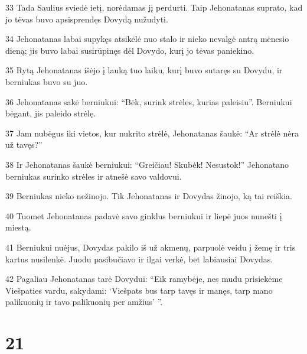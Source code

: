 \par 33 Tada Saulius sviedė ietį, norėdamas jį perdurti. Taip Jehonatanas suprato, kad jo tėvas buvo apsisprendęs Dovydą nužudyti. 
\par 34 Jehonatanas labai supykęs atsikėlė nuo stalo ir nieko nevalgė antrą mėnesio dieną; jis buvo labai susirūpinęs dėl Dovydo, kurį jo tėvas paniekino. 
\par 35 Rytą Jehonatanas išėjo į lauką tuo laiku, kurį buvo sutaręs su Dovydu, ir berniukas buvo su juo. 
\par 36 Jehonatanas sakė berniukui: “Bėk, surink strėles, kurias paleisiu”. Berniukui bėgant, jis paleido strėlę. 
\par 37 Jam nubėgus iki vietos, kur nukrito strėlė, Jehonatanas šaukė: “Ar strėlė nėra už tavęs?” 
\par 38 Ir Jehonatanas šaukė berniukui: “Greičiau! Skubėk! Nesustok!” Jehonatano berniukas surinko strėles ir atnešė savo valdovui. 
\par 39 Berniukas nieko nežinojo. Tik Jehonatanas ir Dovydas žinojo, ką tai reiškia. 
\par 40 Tuomet Jehonatanas padavė savo ginklus berniukui ir liepė juos nunešti į miestą. 
\par 41 Berniukui nuėjus, Dovydas pakilo iš už akmenų, parpuolė veidu į žemę ir tris kartus nusilenkė. Juodu pasibučiavo ir ilgai verkė, bet labiausiai Dovydas. 
\par 42 Pagaliau Jehonatanas tarė Dovydui: “Eik ramybėje, nes mudu prisiekėme Viešpaties vardu, sakydami: ‘Viešpats bus tarp tavęs ir manęs, tarp mano palikuonių ir tavo palikuonių per amžius’ ”.



\chapter{21}


